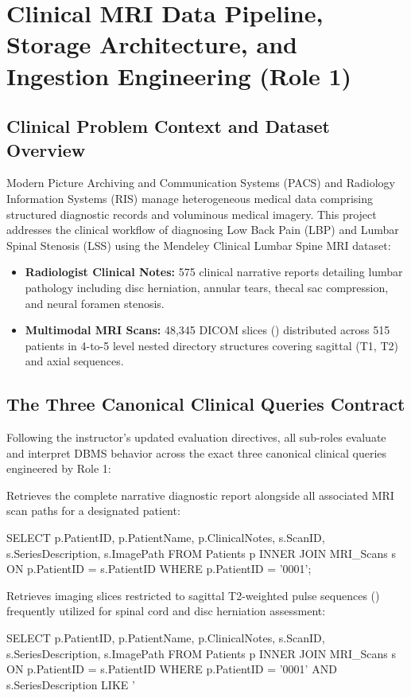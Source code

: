 \chapter{Clinical MRI Data Pipeline, Storage Architecture, and Ingestion Engineering (Role 1)}

\section{Clinical Problem Context and Dataset Overview}
Modern Picture Archiving and Communication Systems (PACS) and Radiology Information Systems (RIS) manage heterogeneous medical data comprising structured diagnostic records and voluminous medical imagery. This project addresses the clinical workflow of diagnosing Low Back Pain (LBP) and Lumbar Spinal Stenosis (LSS) using the Mendeley Clinical Lumbar Spine MRI dataset:
\begin{itemize}
    \item \textbf{Radiologist Clinical Notes:} 575 clinical narrative reports detailing lumbar pathology including disc herniation, annular tears, thecal sac compression, and neural foramen stenosis.
    \item \textbf{Multimodal MRI Scans:} 48,345 DICOM slices () distributed across 515 patients in 4-to-5 level nested directory structures covering sagittal (T1, T2) and axial sequences.
\end{itemize}

\section{The Three Canonical Clinical Queries Contract}
Following the instructor's updated evaluation directives, all sub-roles evaluate and interpret DBMS behavior across the exact three canonical clinical queries engineered by Role 1:

Retrieves the complete narrative diagnostic report alongside all associated MRI scan paths for a designated patient:
\begin{SQLCode}
SELECT p.PatientID, p.PatientName, p.ClinicalNotes,
       s.ScanID, s.SeriesDescription, s.ImagePath
FROM Patients p
INNER JOIN MRI_Scans s ON p.PatientID = s.PatientID
WHERE p.PatientID = '0001';
\end{SQLCode}

Retrieves imaging slices restricted to sagittal T2-weighted pulse sequences () frequently utilized for spinal cord and disc herniation assessment:
\begin{SQLCode}
SELECT p.PatientID, p.PatientName, p.ClinicalNotes,
       s.ScanID, s.SeriesDescription, s.ImagePath
FROM Patients p
INNER JOIN MRI_Scans s ON p.PatientID = s.PatientID
WHERE p.PatientID = '0001' AND s.SeriesDescription LIKE '%
\end{SQLCode}

